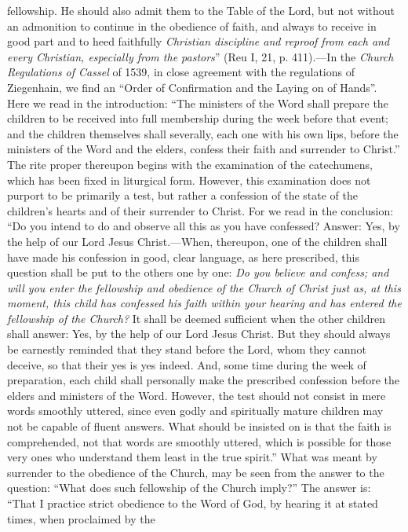 fellowship. He should also admit them to the Table of the Lord, but not without an admonition to continue in the obedience of faith, and always to receive in good part and to heed faithfully \emph{Christian discipline and reproof from each and every Christian, especially from the pastors}” (Reu I, 21, p. 411).—In the \emph{Church Regulations of Cassel} of 1539, in close agreement with the regulations of Ziegenhain, we find an “Order of Confirmation and the Laying on of Hands”. Here we read in the introduction: “The ministers of the Word shall prepare the children to be received into full membership during the week before that event; and the children themselves shall severally, each one with his own lips, before the ministers of the Word and the elders, confess their faith and surrender to Christ.” The rite proper thereupon begins with the examination of the catechumens, which has been fixed in liturgical form. However, this examination does not purport to be primarily a test, but rather a confession of the state of the children’s hearts and of their surrender to Christ. For we read in the conclusion: “Do you intend to do and observe all this as you have confessed? Answer: Yes, by the help of our Lord Jesus Christ.—When, thereupon, one of the children shall have made his confession in good, clear language, as here prescribed, this question shall be put to the others one by one: \emph{Do you believe and confess; and will you enter the fellowship and obedience of the Church of Christ just as, at this moment, this child has confessed his faith within your hearing and has entered the fellowship of the Church?} It shall be deemed sufficient when the other children shall answer: Yes, by the help of our Lord Jesus Christ. But they should always be earnestly reminded that they stand before the Lord, whom they cannot deceive, so that their yes is yes indeed. And, some time during the week of preparation, each child shall personally make the prescribed confession before the elders and ministers of the Word. However, the test should not consist in mere words smoothly uttered, since even godly and spiritually mature children may not be capable of fluent answers. What should be insisted on is that the faith is comprehended, not that words are smoothly uttered, which is possible for those very ones who understand them least in the true spirit.” What was meant by surrender to the obedience of the Church, may be seen from the answer to the question: “What does such fellowship of the Church imply?” The answer is: “That I practice strict obedience to the Word of God, by hearing it at stated times, when proclaimed by the
